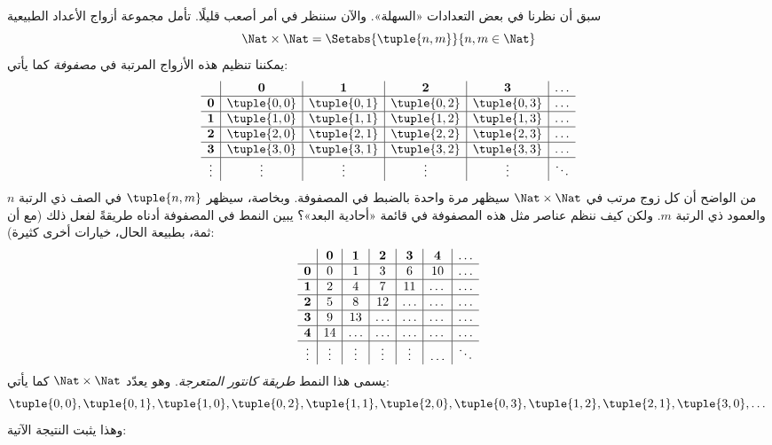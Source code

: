 \documentclass[../../../include/open-logic-section]{subfiles}
\begin{document}


\begin{explain}
سبق أن نظرنا في بعض التعدادات «السهلة». والآن سننظر في أمر أصعب
قليلًا. تأمل مجموعة أزواج الأعداد
الطبيعية
\[
\Nat \times \Nat = \Setabs{\tuple{n,m}}{n,m \in \Nat}
\]
يمكننا تنظيم هذه الأزواج المرتبة في \emph{مصفوفة} كما يأتي:
\[
\begin{array}{ c | c | c | c | c | c}
& \mathbf 0 & \mathbf 1 & \mathbf 2 & \mathbf 3 & \dots \\
\hline
\mathbf 0 & \tuple{0,0} & \tuple{0,1} & \tuple{0,2} & \tuple{0,3} & \dots \\
\hline
\mathbf 1 & \tuple{1,0} & \tuple{1,1} & \tuple{1,2} & \tuple{1,3} & \dots \\
\hline
\mathbf 2 & \tuple{2,0} & \tuple{2,1} & \tuple{2,2} & \tuple{2,3} & \dots \\
\hline
\mathbf 3 & \tuple{3,0} & \tuple{3,1} & \tuple{3,2} & \tuple{3,3} & \dots \\
\hline
\vdots & \vdots & \vdots & \vdots & \vdots & \ddots\\
\end{array}
\]
من الواضح أن كل زوج مرتب في $\Nat \times \Nat$ سيظهر مرة واحدة
بالضبط في المصفوفة. وبخاصة، سيظهر $\tuple{n,m}$ في الصف ذي الرتبة
$n$ والعمود ذي الرتبة $m$. ولكن كيف ننظم عناصر مثل هذه المصفوفة في
قائمة «أحادية البعد»؟ يبين النمط في المصفوفة أدناه طريقةً لفعل ذلك
(مع أن ثمة، بطبيعة الحال، خيارات أخرى كثيرة):
\[
\begin{array}{ c | c | c | c | c | c | c}
& \mathbf 0 & \mathbf 1 & \mathbf 2 & \mathbf 3 & \mathbf 4 &\dots \\
\hline
\mathbf 0 & 0  & 1& 3 & 6& 10 &\ldots \\
\hline
\mathbf 1 &2 & 4& 7 & 11 & \dots &\ldots \\
\hline
\mathbf 2 & 5 & 8 & 12 & \ldots & \dots&\ldots \\
\hline
\mathbf 3 & 9 & 13 & \ldots & \ldots & \dots & \ldots \\
\hline
\mathbf 4 & 14 & \ldots & \ldots & \ldots & \dots & \ldots \\
\hline
\vdots & \vdots & \vdots & \vdots & \vdots&\ldots & \ddots\\
\end{array}
\]\noindent
يسمى هذا النمط \emph{طريقة كانتور المتعرجة}. وهو يعدّد
$\Nat \times \Nat$ كما يأتي:
\[
\tuple{0,0}, \tuple{0,1}, \tuple{1,0}, \tuple{0,2}, \tuple{1,1},
\tuple{2,0}, \tuple{0,3}, \tuple{1,2}, \tuple{2,1}, \tuple{3,0}, \dots
\]
وهذا يثبت النتيجة الآتية:
\end{explain}
\end{document}
